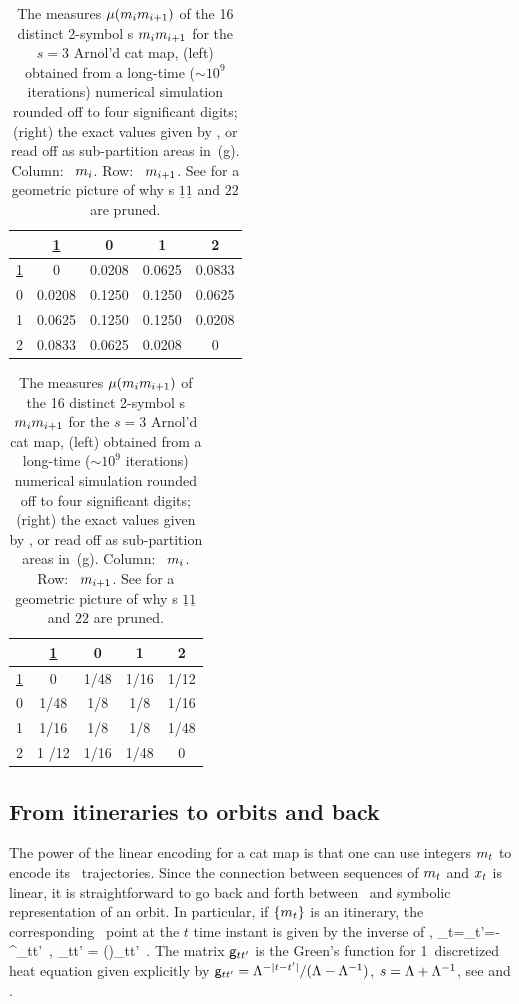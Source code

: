 \documentclass[12pt]{iopart}
\begin{document}
 \begin{table}
\begin{center}
\begin{tabular}{ c|cccc }
 & \underline{1} & 0 & 1 & 2\\
  \hline
 \underline{1} &  0  & 0.0208 &  0.0625 &  0.0833\\
 0 &  0.0208 &  0.1250 &  0.1250 &  0.0625 \\
 1 & 0.0625 & 0.1250 & 0.1250 &  0.0208\\
 2 & 0.0833 & 0.0625 &  0.0208&  0\\
\end{tabular}
\quad
\begin{tabular}{ c|cccc }
 & \underline{1} & 0 & 1 & 2\\
  \hline
 \underline{1} &  0    & 1/48 &  1/16 &  1/12\\
 0 &  1/48 &  1/8 &  1/8 &  1/16 \\
  1 &  1/16 & 1/8  &  1/8 &  1/48\\
  2 & 1 /12 & 1/16 &  1/48 &  0\\
\end{tabular}
\end{center}
  \caption{\label{tab:RJ2letFreq}
The measures ${\mu}({m_{i}}{m_{i+1}})$ of the 16 distinct 2-symbol \brick s
${m_{i}} {m_{i+1}}$ for the  $s=3$ Arnol'd cat map,
    (left)
obtained from a long-time ($\sim10^9$ iterations) numerical simulation
rounded off to  four significant  digits;
    (right)
the exact values given by , or read off as sub-partition
areas in \,(g).
Column: \ ${m_{i}}$.  Row: \ ${m_{i+1}}$.
See  for a geometric picture of why {\brick
s}  $\underline{1}\underline{1}$ and $22$ are pruned.
  }
\end{table}


\subsection{From itineraries to orbits and back}
\label{sect:catLinGreen}

The power of the linear encoding for a cat map is that one can
use  integers ${m_{t}}$ to encode its \statesp\ trajectories. Since the
connection   between  sequences of ${m_{t}}$ and
$x_{t}$ is linear, it is straightforward  to go back and forth between
\statesp\ and symbolic representation of an orbit. In particular, if \(
\{{m_{t}}\} \) is an {\admissible} itinerary, the corresponding
\statesp\ point  at the  $t$ time instant is given by the inverse of
,
\beq
  \ssp_{t}=\sum_{t'=-\infty}^\infty \gd_{tt'} 
  \,, \qquad
  \gd_{tt'} =
       \left(\right)_{tt'}
 \,.
The matrix $\mathsf{g}_{tt'}$ is the  Green's function for 1\dmn\
discretized heat equation given explicitly by
$\mathsf{g}_{tt'}=\Lambda^{-|t-t'|}/(\Lambda-\Lambda^{-1})$,
$s=\Lambda+\Lambda^{-1}$, see  and .
\end{document}
